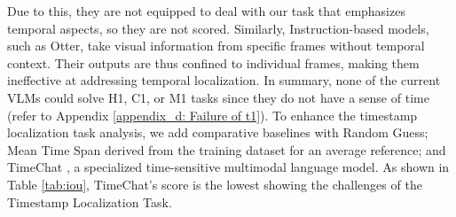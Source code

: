 Due to this, they are not equipped to deal with our task that emphasizes temporal aspects, so they are not scored. Similarly, Instruction-based models, such as Otter, take visual information from specific frames without temporal context. Their outputs are thus confined to individual frames, making them ineffective at addressing temporal localization. In summary, none of the current VLMs could solve H1, C1, or M1 tasks since they do not have a sense of time (refer to Appendix \ref{appendix_d: Failure of t1}). To enhance the timestamp localization task analysis, we add comparative baselines with Random Guess; Mean Time Span derived from the training dataset for an average reference; and TimeChat \cite{Ren2023TimeChat}, a specialized time-sensitive multimodal language model. As shown in Table \ref{tab:iou}, TimeChat’s score is the lowest showing the challenges of the Timestamp Localization Task.\\
